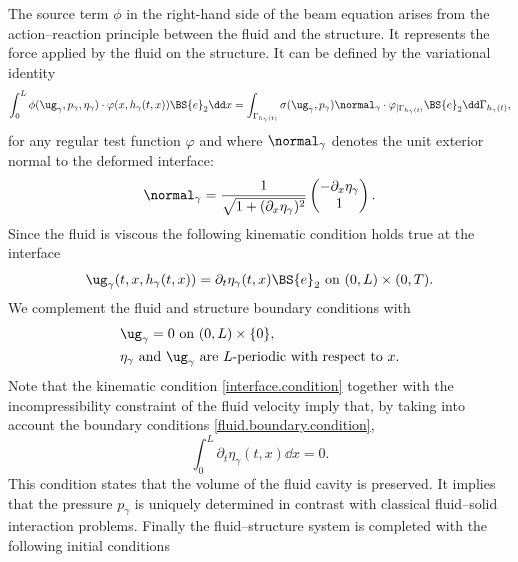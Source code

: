 The source term $\phi$ in the right-hand side of the beam equation arises from the action--reaction principle between the fluid and the structure. It represents the force applied by the fluid on the structure. It can be defined by the variational identity
\begin{equation}
\label{def:forcefluide}
\int_{0}^{L}\phi(\ug_{\gamma},p_{\gamma},\eta_{\gamma})\cdot \varphi(x,h_{\gamma}(t,x))\BS{e}_{2}\dd x=\int_{\Gamma_{h_{\gamma}(t)}}\sigma(\ug_{\gamma},p_{\gamma})\normal_{\gamma}\cdot \varphi_{\vert \Gamma_{h_{\gamma}(t)}}\BS{e}_{2}\dd \Gamma_{h_{\gamma}(t)},
\end{equation}
for any regular test function $\varphi$ and where $\normal_{\gamma}$ denotes the unit exterior normal to the deformed interface:\vspace*{-3pt}
\[
\normal_{\gamma}=\frac{1}{\sqrt{1+(\partial_{x}\eta_{\gamma})^{2}}}\begin{pmatrix}
-\partial_{x}\eta_{\gamma}\\
1
\end{pmatrix}.
\]
Since the fluid is viscous the following kinematic condition holds true at the interface%
\begin{equation}\label{interface.condition}
\ug_{\gamma}(t,x,h_\gamma(t,x))=\partial_{t}\eta_{\gamma}(t,x)\BS{e}_{2}\text{ on } (0, L)\times (0, T).
\end{equation}
We complement the fluid and structure boundary conditions with
\begin{equation}\label{fluid.boundary.condition}
\begin{aligned}
&\ug_{\gamma}=0\text{ on }(0,L)\times \{0\},\\
&\eta_{\gamma}\text{ and }\ug_{\gamma}\text{ are }L\text{-periodic with respect to }x.
\end{aligned}
\end{equation}
Note that the kinematic condition \eqref{interface.condition} together with the incompressibility constraint of the fluid velocity imply that, by taking into account the boundary conditions \eqref{fluid.boundary.condition},%
\begin{equation}\label{compatibilite-vitesse-structure}
\int_0^L\partial_t \eta_\gamma(t,x) \dd x =0.
\end{equation}
This condition states that the volume of the fluid cavity is preserved.
It implies that the pressure $p_{\gamma}$ is uniquely determined in contrast with classical fluid--solid interaction problems.
Finally the fluid--structure system is completed with the following initial conditions
